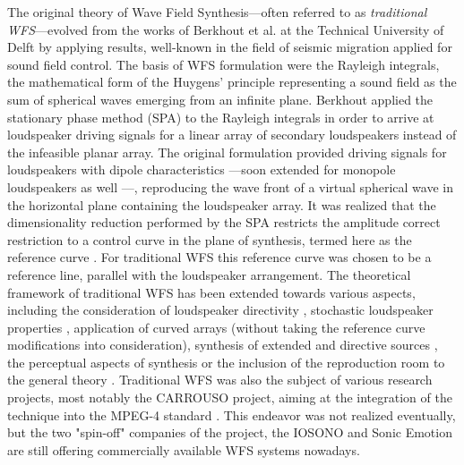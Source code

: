 The original theory of Wave Field Synthesis---often referred to as \emph{traditional WFS}---evolved from the works of Berkhout et al. at the Technical University of Delft by applying results, well-known in the field of seismic migration applied for sound field control.
The basis of WFS formulation were the Rayleigh integrals, the mathematical form of the Huygens' principle representing a sound field as the sum of spherical waves emerging from an infinite plane.
Berkhout applied the stationary phase method (SPA) to the Rayleigh integrals in order to arrive at loudspeaker driving signals for a linear array of secondary loudspeakers instead of the infeasible planar array.
The original formulation provided driving signals for loudspeakers with dipole characteristics \cite{Berkhout1988, Berkhout1993:Acoustic_control_by_WFS}---soon extended for monopole loudspeakers as well \cite{doi:10.1121/1.404755, Vogel1993:phd, devries1994the, Start1997:phd, Verheijen1997:phd, Bruijn2004}---, reproducing the wave front of a virtual spherical wave in the horizontal plane containing the loudspeaker array.
It was realized that the dimensionality reduction performed by the SPA restricts the amplitude correct restriction to a control curve in the plane of synthesis, termed here as the reference curve \cite{sonke1998variable}.
For traditional WFS this reference curve was chosen to be a reference line, parallel with the loudspeaker arrangement.
The theoretical framework of traditional WFS has been extended towards various aspects, including the consideration of loudspeaker directivity \cite{devries1996sound, Firtha2012:isma}, stochastic loudspeaker properties \cite{Firtha2013:daga, Firtha2013:internoise}, application of curved arrays \cite{start1996application} (without taking the reference curve modifications into consideration), synthesis of extended and directive sources \cite{Corteel2007, Baalman2008:phd}, the perceptual aspects of synthesis \cite{Wittek2007:phd, Corteel2006:phd, Hulsebos2004:phd, wittek2004spatial, strauss2004generation} or the inclusion of the reproduction room to the general theory \cite{spors2003an, corteel2003listening, 1326755, buchner2004efficient, petrausch2005simulation}.
Traditional WFS was also the subject of various research projects, most notably the CARROUSO project, aiming at the integration of the technique into the MPEG-4 standard \cite{sporer2001carrouso}. 
This endeavor was not realized eventually, but the two "spin-off" companies of the project, the IOSONO and Sonic Emotion are still offering commercially available WFS systems nowadays.

